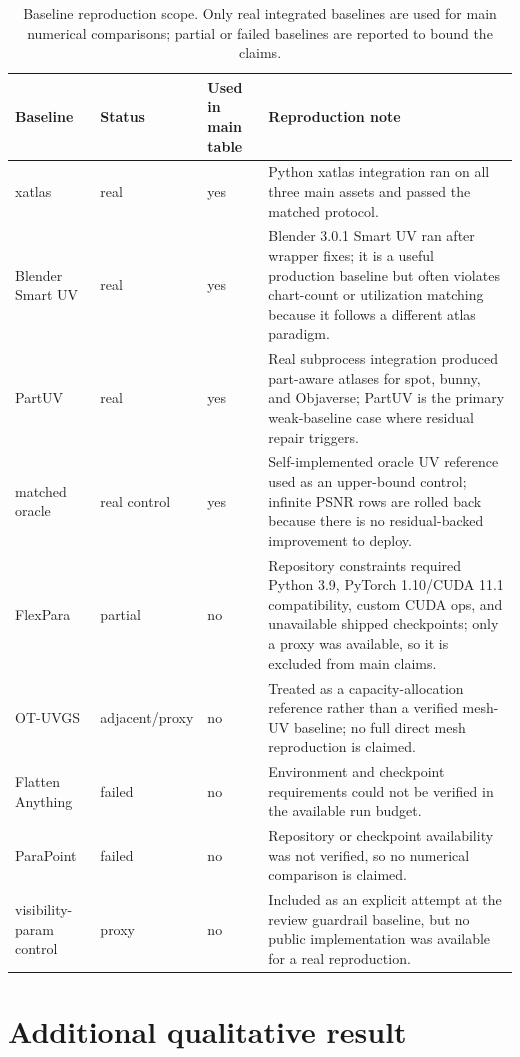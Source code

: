 \begin{table}[t]
\centering
\scriptsize
\caption{Baseline reproduction scope. Only real integrated baselines are used for main numerical comparisons; partial or failed baselines are reported to bound the claims.}
\label{tab:baseline_failure}
\begin{tabularx}{\linewidth}{@{}l l l X@{}}
\toprule
Baseline & Status & Used in main table & Reproduction note \\
\midrule
xatlas & real & yes & Python xatlas integration ran on all three main assets and passed the matched protocol. \\
Blender Smart UV & real & yes & Blender 3.0.1 Smart UV ran after wrapper fixes; it is a useful production baseline but often violates chart-count or utilization matching because it follows a different atlas paradigm. \\
PartUV & real & yes & Real subprocess integration produced part-aware atlases for spot, bunny, and Objaverse; PartUV is the primary weak-baseline case where residual repair triggers. \\
matched oracle & real control & yes & Self-implemented oracle UV reference used as an upper-bound control; infinite PSNR rows are rolled back because there is no residual-backed improvement to deploy. \\
FlexPara & partial & no & Repository constraints required Python 3.9, PyTorch 1.10/CUDA 11.1 compatibility, custom CUDA ops, and unavailable shipped checkpoints; only a proxy was available, so it is excluded from main claims. \\
OT-UVGS & adjacent/proxy & no & Treated as a capacity-allocation reference rather than a verified mesh-UV baseline; no full direct mesh reproduction is claimed. \\
Flatten Anything & failed & no & Environment and checkpoint requirements could not be verified in the available run budget. \\
ParaPoint & failed & no & Repository or checkpoint availability was not verified, so no numerical comparison is claimed. \\
visibility-param control & proxy & no & Included as an explicit attempt at the review guardrail baseline, but no public implementation was available for a real reproduction. \\
\bottomrule
\end{tabularx}
\end{table}

\section{Additional qualitative result}
\label{app:additional_qual}

